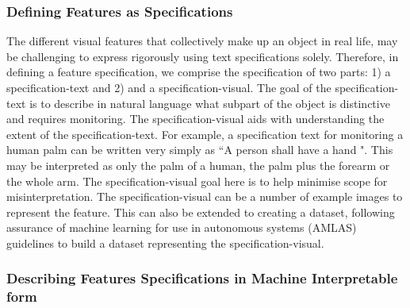 \begin{itemize}


\end{itemize}

\subsubsection{Defining Features as Specifications}
The different visual features that collectively make up an object in real life, may be challenging to express rigorously using text specifications solely. Therefore, in defining a feature specification, we comprise the specification of two parts: 1) a specification-text and 2) and a specification-visual. 
%
The goal of the specification-text is to describe in natural language what subpart of the object is distinctive and requires monitoring. The specification-visual aids with understanding the extent of the specification-text. 
%
For example, a specification text for monitoring a human palm can be written very simply as ``A person shall have a hand ". This may be interpreted as only the palm of a human, the palm plus the forearm or the whole arm. The specification-visual goal here is to help minimise scope for misinterpretation. 
%
The specification-visual can be a number of example images to represent the feature. This can also be extended to creating a dataset, following assurance of machine learning for use in autonomous systems (AMLAS) guidelines \cite{hawkins2021guidance} to build a dataset representing the specification-visual.
\subsubsection{Describing Features Specifications in Machine Interpretable form}

